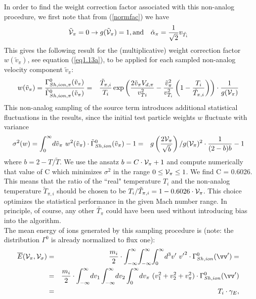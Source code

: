 In order to find the weight correction factor associated with this non-analog
procedure, we first note that from (\ref{normfac}) we have
\begin{displaymath}
{\tilde{\cal V}}_{\pi} = 0 \rightarrow g({\tilde{\cal V}}_{\pi}) =1, \mbox{and}  \quad \tilde{\alpha}_{\pi}   = \frac{1}{\sqrt{2}}v_{\tilde{T_i}}
\end{displaymath}
This gives the following result for the (multiplicative) weight
correction factor $w ( \tilde{v}_{\pi} )$, see equation (\ref{eq1.13a}), to be applied for each sampled non-analog velocity component
$\tilde v_\pi$:
\begin{eqnarray}
w ( \tilde{v}_{\pi} )   =   \frac{\Gamma^0_{Sh,ion,\pi} (
{\tilde{v}}_{\pi} )}{\tilde{\Gamma}^0_{Sh,ion,\pi} ( \tilde{v}_{\pi}
)}
 & = &  \frac{\tilde{T}_{\pi,i}}{T_i}
\exp \left (  \frac{2 \tilde{v}_{\pi}  V_{d, \pi} }{v_{Ti}^2}    -
\frac { {\tilde{v}_{\pi}}^2}{v_{T_i}^2} \left ( 1   -
\frac{T_i}{ {\tilde{T}_{\pi,i}} }  \right ) \right )
 \cdot  \frac {1}{g({\cal V}_{\pi})}
\label{eq1.28}
\end{eqnarray}
This non-analog sampling of the source term introduces additional
statistical fluctuations in the results, since the initial test
particle weights $w$ fluctuate with variance
\begin{eqnarray}
\sigma^2(w)   =   \int_{0}^{\infty} \! d \tilde{v}_{\pi} \ w^2 (
{\tilde{v}}_{\pi} )  \cdot \tilde{\Gamma}^0_{Sh,ion} (
\tilde{v}_{\pi} )
  -   1 &  = &  g \left ( \frac{2{\cal V}_{\pi}}{\sqrt{b}} \right ) /
g({\cal V}_{\pi})^2
 \cdot  \frac{1}{(2-b)   b}   -   1 \nonumber \\
\label{eq1.29}
\end{eqnarray}
where $b   =   2   -  T / {\tilde{T}}$. We use the
ansatz $b = C  \cdot   {\cal V}_{\pi} + 1$ and compute numerically that
value of C which minimizes $\sigma^2$ in the range $0 \le {\cal V}_{\pi}
\le 1$. We find C = 0.6026. This means that the ratio of the
``real" temperature $T_i$ and the non-analog temperature $\tilde{T}_{\pi,i}$
should be chosen to be $ T_{i} / {\tilde{T}_{\pi,i}}   =   1 - 0.6026  \cdot
{\cal V}_{\pi}$. This choice optimizes the statistical performance in the given Mach number range. In
principle, of course, any other $\tilde{T_{\pi}} $ could have been used
without introducing bias into
the algorithm.\\
The mean energy of ions generated by this sampling procedure is
(note: the distribution $\Gamma^0$ is  already normalized to flux
one):
\begin{eqnarray}\nonumber
\overline{E}({\cal V}_{\pi},{\cal V}_{\sigma})   &=&
 \frac{m_i}{2}    \cdot   \int^\infty_{-\infty} \!
\int^\infty_{-\infty} \! \int^\infty_{0} \!
 d^3v' \
 {v'}^2    \cdot
\Gamma^0_{Sh,ion} (\vv ' ) = \\
&=& \frac{m_i}{2}    \cdot   \int^\infty_{-\infty} \!dv_1
\int^\infty_{-\infty} \!dv_2 \int^\infty_{0} \!
   dv_\pi \
 (v_1^2+v_2^2+v_\pi^2)    \cdot
\Gamma^0_{Sh,ion} (\vv ' ) \\\nonumber
   &=&   T_i    \cdot   \gamma_E    ,
\label{eq1.30}
\end{eqnarray}

